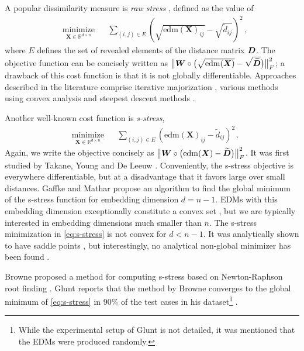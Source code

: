 \documentclass[10pt,double]{IEEEtran}
\providecommand{\R}{\ensuremath{\mathbb{R}}}
\providecommand{\mat}[1]{\ensuremath{\boldsymbol{#1}}}
\providecommand{\wt}[1]{\ensuremath{\widetilde{#1}}}
\providecommand{\mW}{\mat{W}}
\providecommand{\mX}{\mat{X}}\providecommand{\mY}{\mat{Y}}
\newcommand{\EDM}{\ensuremath{\mathrm{edm}}}
\begin{document}
A popular dissimilarity measure is \emph{raw stress}
\cite{kruskal1964b}, defined as the value of 
\begin{equation}
\label{eq:stress}
\begin{aligned}
& \underset{\mX\in\R^{d\times n}}{\text{minimize}} 
& & \sum_{(i, j) \in E}  \left(\sqrt{\EDM(\mX)_{ij}} - \sqrt{\wt{d}_{ij}}\right)^2\,,
\end{aligned}
\end{equation}
where $E$ defines the set of revealed elements of the distance matrix $\mD$.
The objective function can be concisely written as $\big\|\mW \circ
\big(\sqrt{\EDM(\mX)} -
\sqrt{\wt{\mD}}\big)\big\|_F^2$; a drawback of this cost function is that it
is not globally differentiable. Approaches described in the
literature comprise iterative majorization \cite{DeLeeuw1977}, various methods
using convex analysis \cite{mathar1991} and steepest descent methods
\cite{guttman1968}.

Another well-known cost function is \emph{s-stress},
\begin{equation}
\label{eq:s-stress}
\begin{aligned}
& \underset{\mX\in\R^{d\times n}}{\text{minimize}} 
& & \sum_{(i, j) \in E}  \left(\EDM(\mX)_{ij} - \wt{d}_{ij}\right)^2 \, .
\end{aligned}
\end{equation}
Again, we write the objective concisely as $\big\|\mW \circ \big(\EDM(\mX)-
\wt{\mD} \big)\big\|_F^2$. It was first studied by Takane, Young and De Leeuw
\cite{takane1977}. Conveniently, the s-stress objective is everywhere
differentiable, but at a disadvantage that it favors large over small
distances. Gaffke and Mathar \cite{gaffke1989} propose an algorithm to find
the global minimum of the s-stress function for embedding dimension $d=n-1$.
EDMs with this embedding dimension exceptionally constitute a convex set
\cite{Dattorro:2011wa}, but we are typically interested in embedding
dimensions much smaller than $n$. The s-stress minimization in
\eqref{eq:s-stress} is not convex for $d < n-1$. It was analytically shown to
have saddle points \cite{rezathesis13}, but interestingly, no analytical
non-global minimizer has been found \cite{rezathesis13}.

Browne proposed a method for computing s-stress based on Newton-Raphson root
finding \cite{Browne1987}. Glunt reports that the method by Browne  converges
to the global minimum of \eqref{eq:s-stress} in 90\% of the test cases in his
dataset\footnote{While the experimental setup of Glunt
\cite{gluntEmbedding1991} is not detailed, it was mentioned that the EDMs were
produced randomly.} \cite{gluntEmbedding1991}.
\end{document}
